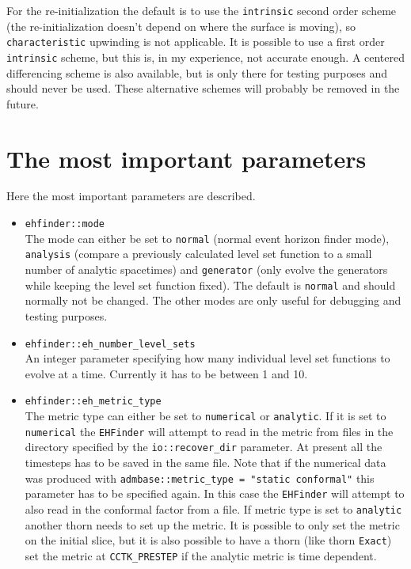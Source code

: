 For the re-initialization the default is to use the {\tt intrinsic} 
second order scheme (the re-initialization doesn't depend on where the
surface is moving), so {\tt characteristic} upwinding is not applicable.
It is possible to use a first order {\tt intrinsic} scheme, but this is, in my
experience, not accurate enough. A centered differencing scheme is also
available, but is only there for testing purposes and should never be used.
These alternative schemes will probably be removed in the future.

\section{The most important parameters}
Here the most important parameters are described.
\begin{itemize}
\item {\tt ehfinder::mode} \\  
  The mode can either be set to {\tt normal} (normal event horizon finder
  mode), {\tt analysis} (compare a previously calculated level set function to
  a small number of analytic spacetimes) and {\tt generator} (only evolve
  the generators while keeping the level set function fixed). The
  default is {\tt normal} and should normally not be changed. The other modes
  are only useful for debugging and testing purposes.
\item{\tt ehfinder::eh\_number\_level\_sets} \\
  An integer parameter specifying how many individual level set functions to
  evolve at a time. Currently it has to be between 1 and 10.
\item {\tt ehfinder::eh\_metric\_type} \\
  The metric type can either be set to {\tt numerical} or {\tt analytic}. If
  it is set to {\tt numerical} the {\tt EHFinder} will attempt to read in the
  metric from files in the directory specified by the {\tt io::recover\_dir}
  parameter. At present all the timesteps has to be saved in the same file.
  Note that if the numerical data was produced with
  {\tt admbase::metric\_type = "static conformal"} this parameter has to be
  specified again. In this case the {\tt EHFinder} will attempt to also read
  in the conformal factor from a file.
  If metric type is set to {\tt analytic} another thorn needs to set up the
  metric. It is possible to only set the metric on the initial slice, but it
  is also possible to have a thorn (like thorn {\tt Exact}) set the metric at
  {\tt CCTK\_PRESTEP} if the analytic metric is time dependent.

\end{itemize}
